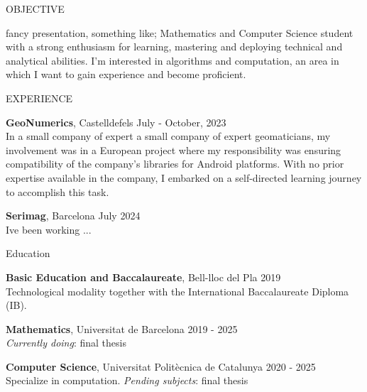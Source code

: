 \documentclass{resume} %
\begin{document}

\begin{rSection}{OBJECTIVE}

{fancy presentation, something like; Mathematics and Computer Science student with a strong enthusiasm for learning, mastering and deploying technical
and analytical abilities. I’m interested in algorithms and computation, an area in which I want to gain experience
and become proficient.}


\end{rSection}


\begin{rSection}{EXPERIENCE}

{\bf GeoNumerics}, Castelldefels \hfill {July - October, 2023}\\
In a small company of expert a small company of expert geomaticians,  my involvement was in a European project where my responsibility was ensuring compatibility of the company’s libraries for Android platforms. With no prior expertise available in the company, I embarked on a self-directed learning journey to accomplish this task.

{\bf Serimag}, Barcelona \hfill {July 2024}\\
Ive been working ...

\end{rSection}

\begin{rSection}{Education}

{\bf Basic Education and Baccalaureate}, Bell-lloc del Pla \hfill {2019}\\
Technological modality together with the International Baccalaureate Diploma (IB).

{\bf Mathematics}, Universitat de Barcelona \hfill {2019 - 2025}\\
\textit{Currently doing}: final thesis 

{\bf Computer Science}, Universitat Politècnica de Catalunya \hfill {2020 - 2025}\\
Specialize in computation. \textit{Pending subjects}: final thesis \\

\end{rSection}
\end{document}
